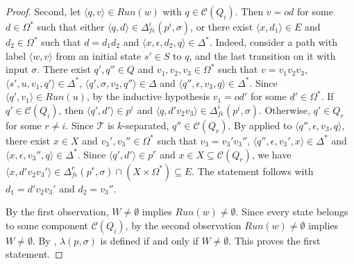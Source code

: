 \begin{proof}
  Second, let $\langle q, v \rangle \in Run(w)$ with $q \in \mathcal{C}(Q_i)$. Then $v
  = od$ for some $d \in \Omega^*$ such that either $\langle q, d \rangle \in
  \Delta_{f\epsilon}^i(p^i, \sigma)$, or there exist $\langle x, d_1 \rangle \in E$
  and $d_2 \in \Omega^*$ such that $d = d_1 d_2$ and $\langle x, \epsilon, d_2, q
  \rangle \in \Delta^*$. Indeed, consider a path with label $\langle w, v \rangle$
  from an initial state $s' \in S$ to $q$, and the last transition on it with input
  $\sigma$. There exist $q', q'' \in Q$ and $v_1, v_2, v_3 \in \Omega^*$ such that $v
  = v_1 v_2 v_3$, $\langle s', u, v_1, q' \rangle \in \Delta^*$, $\langle q', \sigma,
  v_2, q'' \rangle \in \Delta$ and $\langle q'', \epsilon, v_3, q \rangle \in
  \Delta^*$. Since $\langle q', v_1 \rangle \in Run(u)$, by the inductive hypothesis
  $v_1 = od'$ for some $d' \in \Omega^*$. If $q' \in \mathcal{C}(Q_i)$, then $\langle
  q', d' \rangle \in p^i$ and $\langle q, d'v_2v_3 \rangle \in
  \Delta_{f\epsilon}^i(p^i, \sigma)$. Otherwise, $q' \in Q_r$ for some $r \neq i$.
  Since $\mathcal{T}$ is $k$-separated, $q'' \in \mathcal{C}(Q_r)$. By
   applied to $\langle q'', \epsilon, v_3, q \rangle$,
  there exist $x \in X$ and $v_3', v_3'' \in \Omega^*$ such that $v_3 = v_3'v_3''$,
  $\langle q'', \epsilon, v_3', x \rangle \in \Delta^*$ and $\langle x, \epsilon,
  v_3'', q \rangle \in \Delta^*$. Since $\langle q', d' \rangle \in p^r$ and $x \in X
  \subseteq \mathcal{C}(Q_r)$, we have $\langle x, d'v_2v_3' \rangle \in
  \Delta_{f\epsilon}^r(p^r, \sigma) \cap (X \times \Omega^*) \subseteq E$. The
  statement follows with $d_1 = d'v_2v_3'$ and $d_2 = v_3''$.

  By the first observation, $W \neq \emptyset$ implies $Run(w) \neq \emptyset$. Since
  every state belongs to some component $\mathcal{C}(Q_i)$, by the second observation
  $Run(w) \neq \emptyset$ implies $W \neq \emptyset$. By
  , $\lambda(p, \sigma)$ is defined if and only if $W
  \neq \emptyset$. This proves the first statement.


\end{proof}
